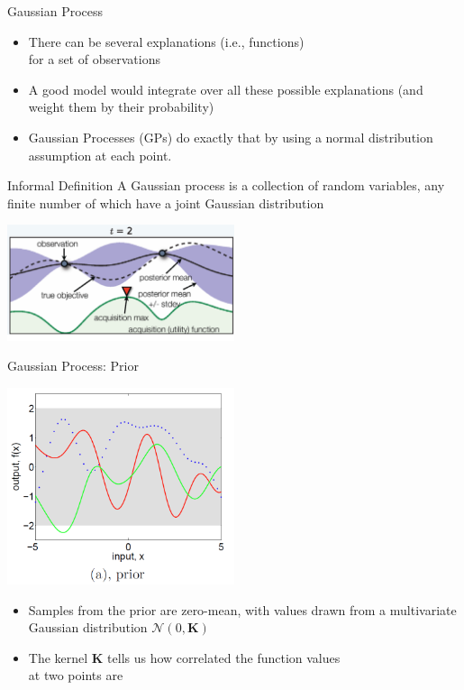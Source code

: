 \begin{frame}[c]{Gaussian Process}

\begin{itemize}
	\item There can be several explanations (i.e., functions)\\ for a set of observations
	\item A good model would integrate over all these possible explanations (and weight them by their probability)
	\item Gaussian Processes (GPs) do exactly that by using a normal distribution assumption at each point.
\end{itemize}

\begin{block}{Informal Definition}
A Gaussian process is a collection of random variables, any finite number of which have a joint Gaussian distribution
\end{block}

\centering
\includegraphics[width=0.5\textwidth]{images/bo_pic1.png}

\end{frame}
\begin{frame}[c]{Gaussian Process: Prior}

\centering
\includegraphics[width=0.5\textwidth]{images/gp_prior.png}

\begin{itemize}
	\item Samples from the prior are zero-mean, with values drawn from a multivariate Gaussian distribution $\mathcal{N}(0,\mathbf{K})$
	\item The kernel $\mathbf{K}$ tells 
	us how correlated the function values\\ at two points are
\end{itemize}

\end{frame}
